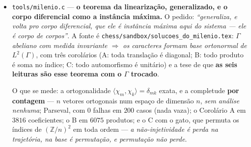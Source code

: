 \documentclass[11pt]{article}
\newcommand{\code}[1]{\texttt{\small #1}}
\newcommand{\Z}{\mathbb Z}
\theoremstyle{plain}
\theoremstyle{remark}
\begin{document}
\begin{itemize}
\textbf{O circuito, e o que ele promete.} Fluido $\to$ lineariza (Parseval fecha) $\to$ resíduo
$\sim10^{-13}$ $\to$ volta pelo espelho $\to$ fecha, exato. E a régua do espelho, com uma correção
que a medida impôs: ia escrever que $\nu\circ\mathrm{rev}$ inverte as duas grandezas, e não
inverte --- \emph{cada uma inverte exatamente uma}. Hodge $(E,B)\mapsto(B,-E)$ \textbf{preserva} o
Poynting e \textbf{inverte} a impedância; $\nu\circ\mathrm{rev}$, a inversão $E\mapsto1/B$, faz o
oposto. Por isso Hodge é meia dualidade e $\nu\circ\mathrm{rev}$ é a \emph{outra} metade: a
dualidade inteira é a composição, e só ela vira as duas. É o mesmo padrão do §B12 --- uma torre
sozinha não fecha, é o par que fecha. E o espelho tem ordem $2$, como o conjugado (§B14), o $i^*$
(§U2) e $\hat{\hat\Gamma}=\Gamma$ (§M5).

\textbf{E é isto que se promete, e só isto.} Não se promete chegar: essa garantia não existe nem em
princípio. Promete-se \textbf{fechar} --- e quando fecha, o resíduo diz que fechou. É verificação a
posteriori, não promessa a priori, e é a única espécie de certificado que cabe num sistema finito.
\emph{``Chega sempre?'' é indecidível; ``fechou desta vez?'' tem resposta, e a resposta é um
número.} A formulação estática vai ao lixo sem drama nenhum: ela pede uma garantia que ninguém pode
dar, sobre objetos que só fecham no limite, depois de ter jogado fora o gerador que os fazia mexer.

\item \code{tools/milenio.c} --- \textbf{o teorema da linearização, generalizado, e o corpo
diferencial como a instância máxima.} O pedido: \emph{``generaliza, e volta pro corpo diferencial,
que ele é instância máxima aqui do sistema --- ele é corpo de corpos''}. A fonte é
\code{chess/sandbox/solucoes\_do\_milenio.tex}: \emph{$\Gamma$ abeliano com medida invariante
$\Rightarrow$ os caracteres formam base ortonormal de $L^2(\Gamma)$}, com três corolários (A: toda
translação é diagonal; B: todo produto é soma no índice; C: todo automorfismo é unitário) e a tese
de que \textbf{as seis leituras são esse teorema com o $\Gamma$ trocado}.

O que se mede: a ortogonalidade $\langle\chi_m,\chi_k\rangle=\delta_{mk}$ exata, e a completude
\textbf{por contagem} --- $n$ vetores ortogonais num espaço de dimensão $n$, \emph{sem análise
nenhuma}; Parseval, com $0$ falhas em $200$ casos (nada vaza); o Corolário A em $3816$
coeficientes; o B em $6075$ produtos; e o C com o gato, que permuta os índices de $(\Z/n)^2$ em
toda ordem --- \emph{a não-injetividade é perda na trajetória, na base é permutação, e permutação
não perde}.


\end{itemize}
\end{document}
